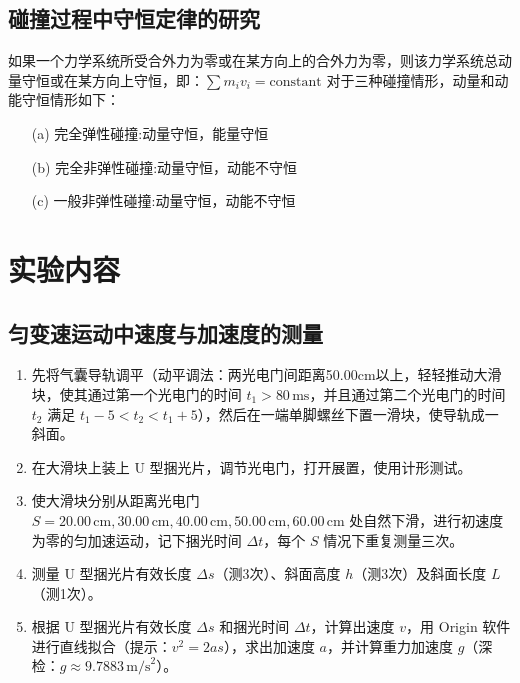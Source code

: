 \documentclass[12pt,a4paper]{article}
\begin{document}
		\subsection{碰撞过程中守恒定律的研究}
			如果一个力学系统所受合外力为零或在某方向上的合外力为零，则该力学系统总动量守恒或在某方向上守恒，即：$\sum m_i v_i = \text{constant}$
			对于三种碰撞情形，动量和动能守恒情形如下：
			\begin{itemize}
    			\item[(a)] 完全弹性碰撞:动量守恒，能量守恒
    			\item[(b)] 完全非弹性碰撞:动量守恒，动能不守恒
    			\item[(c)] 一般非弹性碰撞:动量守恒，动能不守恒
			\end{itemize}
	

	\section{实验内容}
		\subsection{匀变速运动中速度与加速度的测量}
			\begin{enumerate}
				\item 先将气囊导轨调平（动平调法：两光电门间距离50.00cm以上，轻轻推动大滑块，使其通过第一个光电门的时间 $t_1 > 80\,\text{ms}$，并且通过第二个光电门的时间 $t_2$ 满足 $t_1 - 5 < t_2 < t_1 + 5$），然后在一端单脚螺丝下置一滑块，使导轨成一斜面。
				\item 在大滑块上装上 U 型捆光片，调节光电门，打开展置，使用计形测试。
				\item 使大滑块分别从距离光电门 $S = 20.00\,\text{cm}, 30.00\,\text{cm}, 40.00\,\text{cm}, 50.00\,\text{cm}, 60.00\,\text{cm}$ 处自然下滑，进行初速度为零的匀加速运动，记下捆光时间 $\Delta t$，每个 $S$ 情况下重复测量三次。
				\item 测量 U 型捆光片有效长度 $\Delta s$（测3次）、斜面高度 $h$（测3次）及斜面长度 $L$（测1次）。
				\item 根据 U 型捆光片有效长度 $\Delta s$ 和捆光时间 $\Delta t$，计算出速度 $v$，用 Origin 软件进行直线拟合（提示：$v^2 = 2as$），求出加速度 $a$，并计算重力加速度 $g$（深检：$g \approx 9.7883\,\text{m/s}^2$）。
			\end{enumerate}
\end{document}
